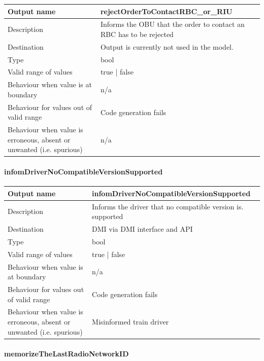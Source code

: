 \begin{longtable}{p{}p{}}
	\toprule
	Output name				& rejectOrderToContactRBC\_or\_RIU \\
	\midrule
	Description				& Informs the OBU that the order to contact an RBC has to be rejected \\
	\midrule
	Destination				& Output is currently not used in the model. \\ 
	\midrule
	Type					& bool \\
	\midrule
	Valid range of values	& true | false \\
	\midrule
	Behaviour when value is at boundary	& n/a \\
	\midrule
	Behaviour for values out of valid range	& Code generation fails \\
	\midrule
	Behaviour when value is erroneous, absent or unwanted (i.e. spurious) & n/a \\
	\bottomrule
\end{longtable}

\paragraph{infomDriverNoCompatibleVersionSupported}

\begin{longtable}{p{}p{}}
	\toprule
	Output name				& infomDriverNoCompatibleVersionSupported \\
	\midrule
	Description				& Informs the driver that no compatible version is. supported \\
	\midrule
	Destination				& DMI via DMI interface and API \\ 
	\midrule
	Type					& bool \\
	\midrule
	Valid range of values	& true | false \\
	\midrule
	Behaviour when value is at boundary	& n/a \\
	\midrule
	Behaviour for values out of valid range	& Code generation fails \\
	\midrule
	Behaviour when value is erroneous, absent or unwanted (i.e. spurious) & Misinformed train driver \\
	\bottomrule
\end{longtable}

\paragraph{memorizeTheLastRadioNetworkID}

